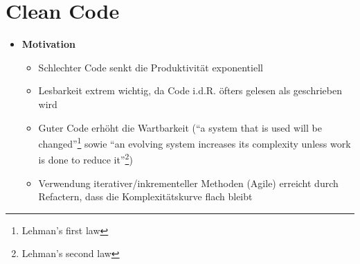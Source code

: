 \section{Clean Code}
\begin{itemize}
	\item \textbf{Motivation}
	\begin{itemize}
		\item Schlechter Code senkt die Produktivität exponentiell
		\item Lesbarkeit extrem wichtig, da Code i.d.R. öfters gelesen als geschrieben wird
		\item Guter Code erhöht die Wartbarkeit ("`a system that is used will be changed"'\footnote{Lehman's first law} sowie "`an evolving system increases its complexity unless work is done to reduce it"'\footnote{Lehman's second law})
		\item Verwendung iterativer/inkrementeller Methoden (Agile) erreicht durch Refactern, dass die Komplexitätskurve flach bleibt
	\end{itemize}
\end{itemize}


